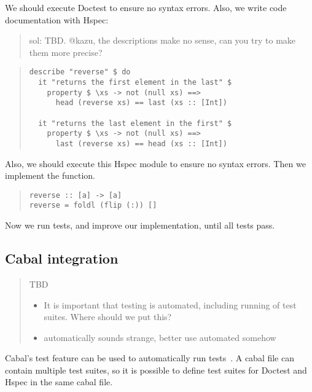 \documentclass[preprint]{sigplanconf}
\begin{document}
\noindent We should execute Doctest to ensure no syntax errors.
Also, we write code documentation with Hspec:

\begin{quote}
    sol: TBD. @kazu, the descriptions make no sense, can you try to
    make them more precise?
\end{quote}

\begin{quote}
\small
\begin{verbatim}
describe "reverse" $ do
  it "returns the first element in the last" $
    property $ \xs -> not (null xs) ==>
      head (reverse xs) == last (xs :: [Int])

  it "returns the last element in the first" $
    property $ \xs -> not (null xs) ==>
      last (reverse xs) == head (xs :: [Int])
\end{verbatim}
\end{quote}

\noindent Also, we should execute this Hspec module
to ensure no syntax errors.
Then we implement the function.

\begin{quote}
\small
\begin{verbatim}
reverse :: [a] -> [a]
reverse = foldl (flip (:)) []
\end{verbatim}
\end{quote}

\noindent Now we run tests, and improve our implementation, until all
tests pass.

\subsection{Cabal integration}

\begin{quote}
    TBD

\begin{itemize}

\item It is important that testing is automated, including running of test
    suites.  Where should we put this?

\item automatically sounds strange, better use automated somehow
\end{itemize}
\end{quote}

\noindent Cabal's test feature can be used to automatically run tests~\cite{cabal}.  A cabal
file can contain multiple test suites, so it is possible to define test suites
for Doctest and Hspec in the same cabal file.
\end{document}
